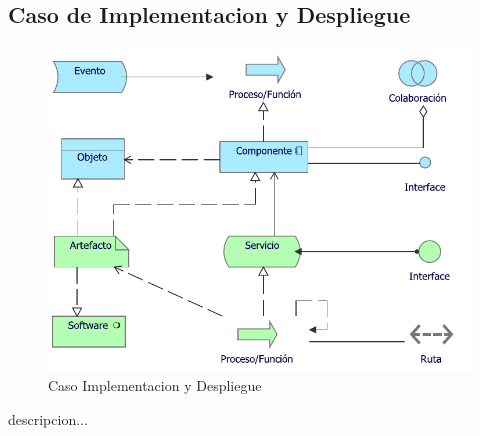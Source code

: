\newpage

\subsection{Caso  de Implementacion y Despliegue}
\begin{figure}[h!]
	\centering
	\includegraphics[width=.5\linewidth]{imgs/caso/Implementacion}
	\caption{Caso Implementacion y Despliegue}
\end{figure}
descripcion...

\newpage